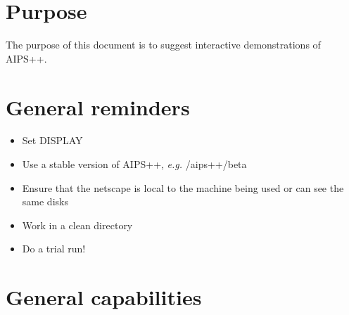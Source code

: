 \newcommand{\thisdocURL}{http://aips2.nrao.edu/aips++/docs/notes/202/202.html}
\newcommand{\searchURL}{../../html/aips2search.html}
\newcommand{\aipsviewURL}{../../user/aipsview/aipsview.html}
\newcommand{\GlishmanualURL}{../../reference/Glish/Glish.html}
\newcommand{\GlishtutorialURL}{../../notes/195/195.html}
\newcommand{\synthesisURL}{../../user/synthesis/synthesis.html}
\newcommand{\gsURL}{../../user/gettingstarted/gettingstarted.html}
\newcommand{\userrefmanualURL}{../../user/Refman/Refman.html}
\newcommand{\specsURL}{../../specs/specs.html}
\newcommand{\betaURL}{../beta/beta.html}
\newcommand{\consortiumURL}{../consortium.html}
%
%

%


\section{Purpose}

The purpose of this document is to suggest interactive demonstrations
of AIPS++.

\section{General reminders}

\begin{itemize}
\item Set DISPLAY
\item Use a stable version of AIPS++, {\em e.g.} /aips++/beta
\item Ensure that the netscape is local to the machine being used or
can see the same disks
\item Work in a clean directory
\item Do a trial run!
\end{itemize}

\section{General capabilities}

